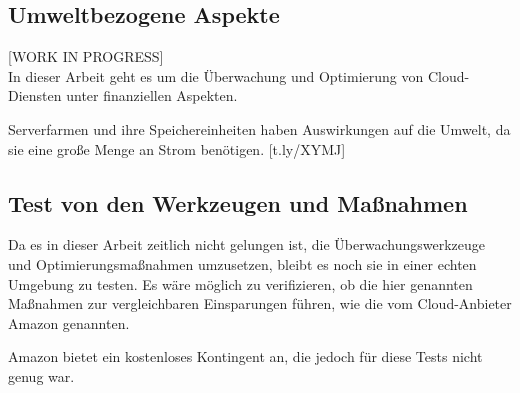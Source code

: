 \begin{comment}(To-Do:)
\\Kapitelweise Kurzdarstellung der Inhalte (inklusive Referenzierung auf die \\Kapitelnummerierung) => Nach dem Motto: \textit{Was wurde wo beschrieben?}
\\Kurzdarstellung \textit{Problem – Lösungsweg – Ergebnisse}
\\Rückkopplung auf die Einleitung: Wurde die Zielstellung der Arbeit und die \\Fragestellung zufriedenstellend beantwortet?
\\Kritische Bewertung (sofern nicht bereits im Hauptteil geschehen)
\\Offene Probleme
\\Richtung der zukünftigen/möglichen Arbeiten
\\Erläuterung, warum welche Aspekte in der Arbeit nicht erläutert 
\end{comment}
\subsection*{Umweltbezogene Aspekte}
[WORK IN PROGRESS]\\
In dieser Arbeit geht es um die Überwachung und Optimierung von Cloud-Diensten unter finanziellen Aspekten. 

Serverfarmen und ihre Speichereinheiten  haben Auswirkungen auf die Umwelt, da sie eine große Menge an Strom benötigen. 
[t.ly/XYMJ]
\\
\subsection*{Test von den Werkzeugen und Maßnahmen}
Da es in dieser Arbeit zeitlich nicht gelungen ist, die Überwachungswerkzeuge und Optimierungsmaßnahmen umzusetzen, bleibt es noch sie in einer echten Umgebung zu testen. Es wäre möglich zu verifizieren, ob die hier genannten Maßnahmen zur vergleichbaren Einsparungen führen, wie die vom Cloud-Anbieter Amazon genannten.

Amazon bietet ein kostenloses Kontingent an, die jedoch für diese Tests nicht genug war. 
\\
